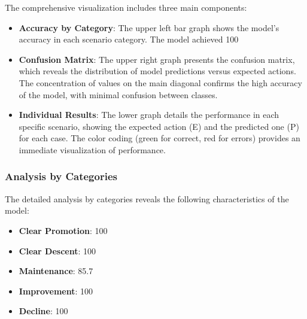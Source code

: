The comprehensive visualization includes three main components:

\begin{itemize}
    \item \textbf{Accuracy by Category}: The upper left bar graph shows the model's accuracy in each scenario category. The model achieved 100%
    
    \item \textbf{Confusion Matrix}: The upper right graph presents the confusion matrix, which reveals the distribution of model predictions versus expected actions. The concentration of values on the main diagonal confirms the high accuracy of the model, with minimal confusion between classes.
    
    \item \textbf{Individual Results}: The lower graph details the performance in each specific scenario, showing the expected action (E) and the predicted one (P) for each case. The color coding (green for correct, red for errors) provides an immediate visualization of performance.
\end{itemize}

\subsubsection{Analysis by Categories}

The detailed analysis by categories reveals the following characteristics of the model:

\begin{itemize}
    \item \textbf{Clear Promotion}: 100%
    
    \item \textbf{Clear Descent}: 100%
    
    \item \textbf{Maintenance}: 85.7%
    
    \item \textbf{Improvement}: 100%
    
    \item \textbf{Decline}: 100%
\end{itemize}

